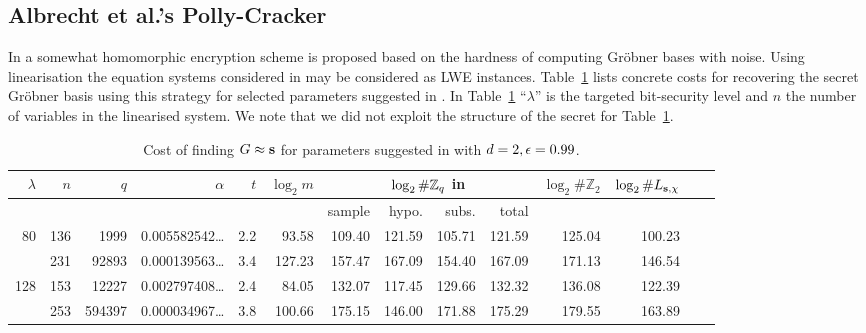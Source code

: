 \subsection{Albrecht et al.'s Polly-Cracker}
\label{sec:parameters:polly}

In \cite{albrecht-farshim-faugere-perret:asiacrypt2011} a somewhat homomorphic encryption scheme is proposed based on the hardness of computing Gröbner bases with noise. Using linearisation the equation systems considered in \cite{albrecht-farshim-faugere-perret:asiacrypt2011} may be considered as LWE instances. Table~\ref{tab:concrete_polly} lists concrete costs for recovering the secret Gröbner basis using this strategy for selected parameters suggested in \cite{albrecht-farshim-faugere-perret:asiacrypt2011}. In Table~\ref{tab:concrete_polly} ``$\lambda$'' is the targeted bit-security level and $n$ the number of variables in the linearised system. We note that we did not exploit the structure of the secret for Table~\ref{tab:concrete_polly}.


\begin{table}[!htb]
\begin{center}
\begin{tabular}{|r|r|r|r||r||r|r|r|r|r|r|r|r|r|} 
\hline
$\lambda $ & $n$ & $q$ & $\alpha$ & $t$ & $\log_2 m $ & \multicolumn{4}{|c|}{$\log_2 \#\mathbb{Z}_q $ in} & $\log_2 \#\mathbb{Z}_2 $ & $\log_2 \#L_{\mathbf{s},\chi} $\\
\hline
& & &    &              &                 &  sample & hypo. & subs. & total & &\\
\hline
 80 &  136 &   1999 & 0.005582542\dots & 2.2 &  93.58 & 109.40 & 121.59 & 105.71 & 121.59 & 125.04 & 100.23\\ 
    &  231 &  92893 & 0.000139563\dots & 3.4 & 127.23 & 157.47 & 167.09 & 154.40 & 167.09 & 171.13 & 146.54\\
\hline                                                                                                    
128 & 153 &  12227 & 0.002797408\dots & 2.4 &  84.05 & 132.07 & 117.45 & 129.66 & 132.32 & 136.08 & 122.39\\
    & 253 & 594397 & 0.000034967\dots & 3.8 & 100.66 & 175.15 & 146.00 & 171.88 & 175.29 & 179.55 & 163.89\\
\hline
\end{tabular}
\end{center}
\caption{Cost of finding $G \approx \mathbf{s}$ for parameters suggested in \cite{albrecht-farshim-faugere-perret:asiacrypt2011} with $d=2, \epsilon=0.99$.}
\label{tab:concrete_polly}
\end{table}


